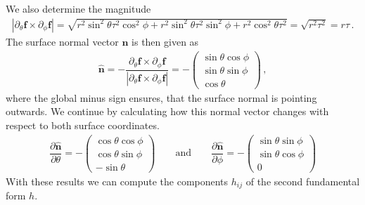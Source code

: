 \documentclass[11pt, DINA4, fleqn]{amsart}
\def\vn{\boldsymbol{n}\xspace}
\def\vf{\boldsymbol{f}\xspace}
\begin{document}
We also determine the magnitude
\begin{align}
|\partial_{\theta}\vf \times \partial_{\phi}\vf | = \sqrt{
r^2\sin^2\theta \tau^2 \cos^2\phi +
r^2\sin^2\theta \tau^2 \sin^2\phi +
r^2\cos^2\theta \tau^2
}=
\sqrt{r^2\tau^2} = r\tau \, .
\end{align}
The surface normal vector $\vn$ is then given as
\begin{align}
\hat{\vn} = -\dfrac{\partial_{\theta}\vf \times \partial_{\phi}\vf}{|\partial_{\theta}\vf \times \partial_{\phi}\vf |}
= -
\begin{pmatrix}
\sin \theta \cos \phi \\
\sin \theta \sin \phi \\
\cos \theta
\end{pmatrix} \, ,
\end{align}
where the global minus sign ensures, that the surface normal is pointing outwards.
We continue by calculating how this normal vector changes with respect to both surface coordinates.
\begin{align}
\dfrac{\partial \hat{\vn}}{\partial \theta} = -\begin{pmatrix}
\cos \theta \cos\phi \\
\cos \theta \sin\phi \\
-\sin \theta
\end{pmatrix}
\qquad \text{and} \qquad
\dfrac{\partial \hat{\vn}}{\partial \phi} = -\begin{pmatrix}
\sin \theta \sin\phi \\
\sin \theta \cos\phi \\
0
\end{pmatrix}
\end{align}
With these results we can compute the components $h_{ij}$ of the second fundamental form $h$.
\end{document}
